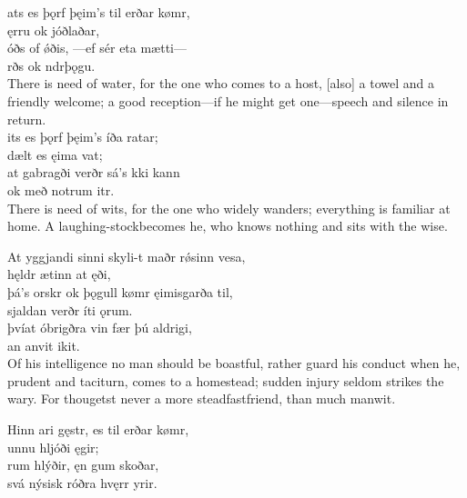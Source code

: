 \bva {}ats es þǫrf \hld þęim's til erðar kømr, \\%
\ind {}ęrru ok jóðlaðar, \\%
óðs of ǿðis, \hld —ef sér eta mætti— \\%
\ind {}rðs ok ndrþǫgu.\\%

\bvb There is need of water, for the one who comes to a host, [also] a towel and a friendly welcome; a good reception—if he might get one—speech and silence in return. \\

\bva {}its es þǫrf \hld þęim's íða ratar; \\%
\ind dælt es ęima vat; \\%
at gabragði \hld verðr sá's kki kann \\%
\ind ok með notrum itr.\\%

\bvb There is need of wits, for the one who widely wanders; everything is familiar at home. A laughing-stock\footnotemark[8] becomes he, who knows nothing and sits with the wise. \\

\bva At yggjandi sinni \hld skyli-t maðr rǿsinn vesa, \\%
\ind hęldr ætinn at ęði, \\%
þá's orskr ok þǫgull \hld kømr ęimisgarða til, \\%
\ind sjaldan verðr íti ǫrum. \\%
þvíat óbrigðra vin \hld fær þú aldrigi, \\%
\ind an anvit ikit.\\%

\bvb Of his intelligence no man should be boastful, rather guard his conduct when he, prudent and taciturn, comes to a homestead; sudden injury seldom strikes the wary. For thou\footnotemark[1] getst never a more steadfast\footnotemark[2] friend, than much manwit. \\

\bva Hinn ari gęstr, \hld es til erðar kømr, \\%
\ind {}unnu hljóði ęgir; \\%
rum hlýðir, \hld ęn gum skoðar, \\%
\ind svá nýsisk róðra hvęrr yrir.\\%

